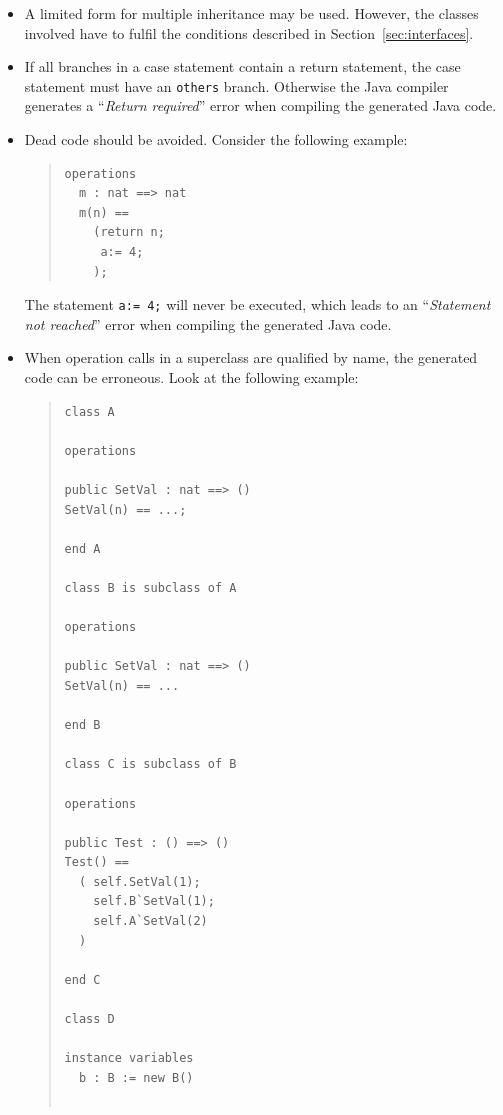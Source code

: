 \documentclass[\pformat,11pt]{article}
\begin{document}
\begin{itemize}
\item A limited form for multiple inheritance may be used. However,
the classes involved have to fulfil the conditions described in
Section~\ref{sec:interfaces}.

\item If all branches in a case statement contain a return statement,
the case statement must have an {\tt others} branch.
Otherwise the Java compiler generates a  ``{\em Return required}'' error when compiling the generated Java code.

\item Dead code should be avoided. Consider the following example:

\begin{quote}
\begin{small}
\begin{verbatim}
operations
  m : nat ==> nat
  m(n) ==
    (return n;
     a:= 4;
    );
\end{verbatim}
\end{small}
\end{quote}

The statement {\tt a:= 4;} will never be executed, which leads to an ``{\em Statement not reached}''
error when compiling the generated Java code.

\item When operation calls in a superclass are qualified by name, the generated code can be erroneous.
Look at the following example:

\begin{quote}
\begin{small}
\begin{verbatim}
class A

operations

public SetVal : nat ==> ()
SetVal(n) == ...;

end A

class B is subclass of A

operations

public SetVal : nat ==> ()
SetVal(n) == ...

end B

class C is subclass of B

operations

public Test : () ==> ()
Test() ==
  ( self.SetVal(1);
    self.B`SetVal(1);
    self.A`SetVal(2)
  )

end C

class D

instance variables
  b : B := new B()


\end{verbatim}
\end{small}
\end{quote}
\end{itemize}
\end{document}
